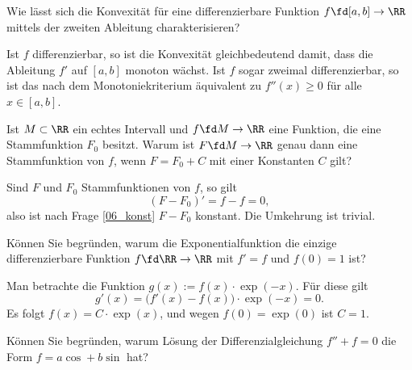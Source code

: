 \begin{frage}
Wie lässt sich die Konvexität für eine 
differenzierbare Funktion 
$f\fd [a,b]\to \RR$ mittels der zweiten Ableitung charakterisieren?
\end{frage}

\begin{antwort}
 
Ist $f$ differenzierbar, so ist die Konvexität gleichbedeutend 
damit, dass die Ableitung $f'$ auf $[a,b]$ monoton wächst. 
Ist $f$ sogar zweimal differenzierbar, so ist das nach dem 
Monotoniekriterium äquivalent zu $f''(x)\ge 0$ für alle 
$x\in [a,b]$. 
\AntEnd
\end{antwort}   

\begin{frage}
Ist $M\subset \RR$ ein echtes Intervall und $f\fd M \to \RR$ eine 
Funktion, die eine Stammfunktion $F_0$ besitzt. Warum ist  
$F\fd M\to \RR$ genau dann eine Stammfunktion von $f$, wenn 
$F=F_0+C$ mit einer Konstanten $C$ gilt?
\end{frage}

\begin{antwort}
Sind $F$ und $F_0$ Stammfunktionen von $f$, so gilt
\[
(F-F_0)'= f-f=0,\]
also ist nach Frage \ref{06_konst} $F-F_0$ konstant. Die Umkehrung ist 
trivial. 
\AntEnd  
 
\end{antwort}

\begin{frage}
Können Sie begründen, warum die Exponentialfunktion die 
einzige differenzierbare Funktion $f\fd \RR \to \RR$ mit 
$f'=f$ und $f(0)=1$ ist?
\end{frage}

\begin{antwort}
Man betrachte die Funktion $g(x) :=f(x)\cdot \exp(-x)$. Für diese gilt 
\[
g'(x)= 
\big(f'(x)-f(x)\big)\cdot \exp(-x)= 0. 
\]
Es folgt $f(x)=C\cdot\exp(x)$, und wegen $f(0)=\exp(0)$ ist $C=1$.
\AntEnd
\end{antwort}

\begin{frage}
Können Sie begründen, warum  Lösung der Differenzialgleichung 
$f''+f=0$ die Form $f=a\cos +b\sin $ hat?
\end{frage}

